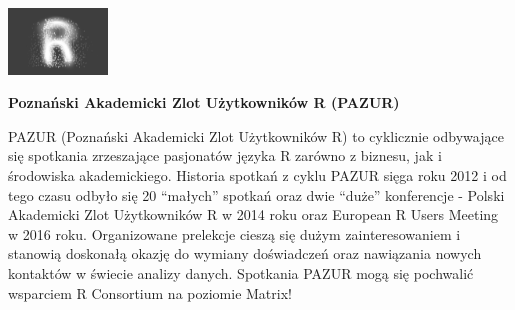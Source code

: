\documentclass[\main/boa.tex]{subfiles}
\begin{document}
	
	\begin{minipage}[t]{0.915\textwidth}
		\center     
		\includegraphics[width=100px]{img/logos.bw/pazur.png} 
	\end{minipage}
	
	\Large \textbf {Poznański Akademicki Zlot Użytkowników R (PAZUR)}
	
	
	\vskip 0.3cm
	\normalsize 
	PAZUR (Poznański Akademicki Zlot Użytkowników R) to cyklicznie odbywające się spotkania zrzeszające pasjonatów języka R zarówno z biznesu, jak i środowiska akademickiego.
	Historia spotkań z cyklu PAZUR sięga roku 2012 i od tego czasu odbyło się 20 “małych” spotkań oraz dwie “duże” konferencje - Polski Akademicki Zlot Użytkowników R w 2014 roku oraz European R Users Meeting w 2016 roku. Organizowane prelekcje cieszą się dużym zainteresowaniem i stanowią doskonałą okazję do wymiany doświadczeń oraz nawiązania nowych kontaktów w świecie analizy danych. Spotkania PAZUR mogą się pochwalić wsparciem R Consortium na poziomie Matrix!
	
	\vskip 1.5cm
\end{document}
